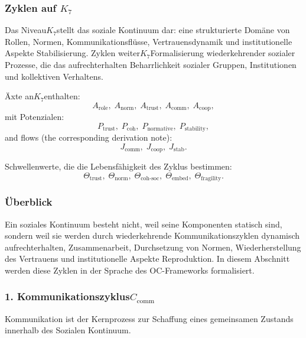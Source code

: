 
\subsubsection{Zyklen auf \texorpdfstring{$K_7$}{K_7}}
\label{sec:cycles-k7}

Das Niveau$K_7$stellt das soziale Kontinuum dar: eine strukturierte Domäne von
Rollen, Normen, Kommunikationsflüsse, Vertrauensdynamik und institutionelle Aspekte
Stabilisierung.
Zyklen weiter$K_7$Formalisierung wiederkehrender sozialer Prozesse, die das aufrechterhalten
Beharrlichkeit sozialer Gruppen, Institutionen und kollektiven Verhaltens.

Äxte an$K_7$enthalten:
\[
  A_{\mathrm{role}},\;
  A_{\mathrm{norm}},\;
  A_{\mathrm{trust}},\;
  A_{\mathrm{comm}},\;
  A_{\mathrm{coop}},
\]
mit Potenzialen:
\[
  P_{\mathrm{trust}},\;
  P_{\mathrm{coh}},\;
  P_{\mathrm{normative}},\;
  P_{\mathrm{stability}},
\]
and flows (the corresponding derivation note):
\[
  J_{\mathrm{comm}},\;
  J_{\mathrm{coop}},\;
  J_{\mathrm{stab}}.
\]

Schwellenwerte, die die Lebensfähigkeit des Zyklus bestimmen:
\[
  \Theta_{\mathrm{trust}},\;
  \Theta_{\mathrm{norm}},\;
  \Theta_{\mathrm{coh\text{-}soc}},\;
  \Theta_{\mathrm{embed}},\;
  \Theta_{\mathrm{fragility}}.
\]

\subsubsection{Überblick}

Ein soziales Kontinuum besteht nicht, weil seine Komponenten statisch sind, sondern weil
sie werden durch wiederkehrende Kommunikationszyklen dynamisch aufrechterhalten,
Zusammenarbeit, Durchsetzung von Normen, Wiederherstellung des Vertrauens und institutionelle Aspekte
Reproduktion.
In diesem Abschnitt werden diese Zyklen in der Sprache des OC-Frameworks formalisiert.

\subsubsection{1. Kommunikationszyklus$C_{\mathrm{comm}}$}

Kommunikation ist der Kernprozess zur Schaffung eines gemeinsamen Zustands innerhalb des Sozialen
Kontinuum.


